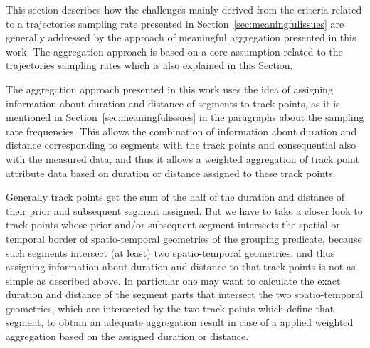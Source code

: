 \documentclass[12pt, oneside, a4paper]{scrbook}
\begin{document}
This section describes how the challenges mainly derived from the criteria related to a trajectories sampling rate presented in Section~\ref{sec:meaningfulissues} are generally addressed by the approach of meaningful aggregation presented in this work.
The aggregation approach is based on a core assumption related to the trajectories sampling rates which is also explained in this Section.
\par\medskip



The aggregation approach presented in this work uses the idea of assigning information about duration and distance of segments to track points, as it is mentioned in Section~\ref{sec:meaningfulissues} in the paragraphs about the sampling rate frequencies. 
This allows the combination of information about duration and distance corresponding to segments with the track points and consequential also with the measured data, and thus it allows a weighted aggregation of track point attribute data based on duration or distance assigned to these track points.
\par\medskip

Generally track points get the sum of the half of the duration and distance of their prior and subsequent segment assigned. 
But we have to take a closer look to track points whose prior and/or subsequent segment intersects the spatial or temporal border of spatio-temporal geometries of the grouping predicate, 
because such segments intersect (at least) two spatio-temporal geometries, and thus assigning information about duration and distance to that track points is not as simple as described above.
In particular one may want to calculate the exact duration and distance of the segment parts that intersect  the two spatio-temporal geometries, which are intersected by the two track points which define that segment, to obtain an adequate aggregation result in case of a applied weighted aggregation based on the assigned duration or distance.
\par\medskip
\end{document}
